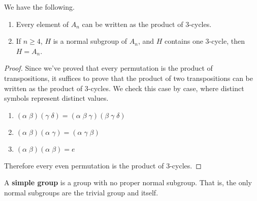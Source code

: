   \begin{lemma}
    \label{thm:cycles_alt}
    We have the following. 
    \begin{enumerate}
      \item Every element of $A_n$ can be written as the product of 3-cycles. 
      \item If $n \geq 4$, $H$ is a normal subgroup of $A_n$, and $H$ contains one 3-cycle, then $H = A_n$. 
    \end{enumerate}
  \end{lemma}
  \begin{proof}
    Since we've proved that every permutation is the product of transpositions, it suffices to prove that the product of two transpositions can be written as the product of 3-cycles. We check this case by case, where distinct symbols represent distinct values. 
    \begin{enumerate}
      \item $(\alpha \; \beta) ( \gamma \; \delta) = (\alpha \; \beta \; \gamma) (\beta \; \gamma \; \delta)$ 
      \item $(\alpha \; \beta)(\alpha \; \gamma) = (\alpha \; \gamma \; \beta)$ 
      \item $(\alpha \; \beta) (\alpha \; \beta) = e$
    \end{enumerate}
    Therefore every even permutation is the product of 3-cycles. 
  \end{proof}

  \begin{definition}
    A \textbf{simple group} is a group with no proper normal subgroup. That is, the only normal subgroups are the trivial group and itself. 
  \end{definition}

